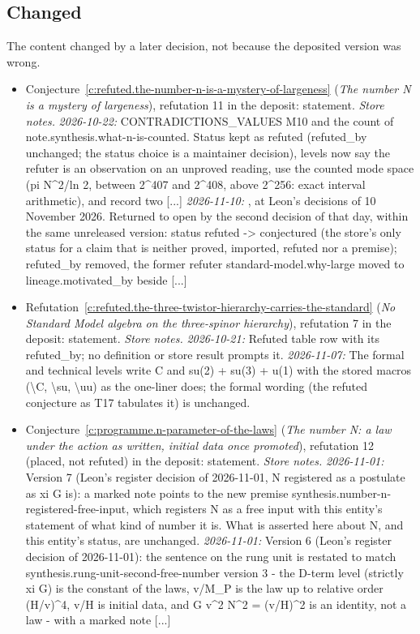 \documentclass[11pt]{article}
\theoremstyle{definition}
\theoremstyle{plain}
\begin{document}
\subsection*{Changed}
The content changed by a later decision, not because the deposited version was wrong.
\begin{itemize}\setlength{\itemsep}{2pt}
\item Conjecture~\ref{c:refuted.the-number-n-is-a-mystery-of-largeness} (\emph{The number N is a mystery of largeness}), refutation 11 in the deposit: statement. \emph{Store notes.} \emph{2026-10-22:} CONTRADICTIONS\_VALUES M10 and the count of note.synthesis.what-n-is-counted. Status kept as refuted (refuted\_by unchanged; the status choice is a maintainer decision), levels now say the refuter is an observation on an unproved reading, use the counted mode space (pi N\^{}2/ln 2, between 2\^{}407 and 2\^{}408, above 2\^{}256: exact interval arithmetic), and record two [...] \emph{2026-11-10:} , at Leon's decisions of 10 November 2026. Returned to open by the second decision of that day, within the same unreleased version: status refuted -> conjectured (the store's only status for a claim that is neither proved, imported, refuted nor a premise); refuted\_by removed, the former refuter standard-model.why-large moved to lineage.motivated\_by beside [...]
\item Refutation~\ref{c:refuted.the-three-twistor-hierarchy-carries-the-standard} (\emph{No Standard Model algebra on the three-spinor hierarchy}), refutation 7 in the deposit: statement. \emph{Store notes.} \emph{2026-10-21:} Refuted table row with its refuted\_by; no definition or store result prompts it. \emph{2026-11-07:} The formal and technical levels write C and su(2) + su(3) + u(1) with the stored macros (\textbackslash{}C, \textbackslash{}su, \textbackslash{}uu) as the one-liner does; the formal wording (the refuted conjecture as T17 tabulates it) is unchanged.
\item Conjecture~\ref{c:programme.n-parameter-of-the-laws} (\emph{The number N: a law under the action as written, initial data once promoted}), refutation 12 (placed, not refuted) in the deposit: statement. \emph{Store notes.} \emph{2026-11-01:} Version 7 (Leon's register decision of 2026-11-01, N registered as a postulate as xi G is): a marked note points to the new premise synthesis.number-n-registered-free-input, which registers N as a free input with this entity's statement of what kind of number it is. What is asserted here about N, and this entity's status, are unchanged. \emph{2026-11-01:} Version 6 (Leon's register decision of 2026-11-01): the sentence on the rung unit is restated to match synthesis.rung-unit-second-free-number version 3 - the D-term level (strictly xi G) is the constant of the laws, v/M\_P is the law up to relative order (H/v)\^{}4, v/H is initial data, and G v\^{}2 N\^{}2 = (v/H)\^{}2 is an identity, not a law - with a marked note [...]
\end{itemize}
\end{document}
